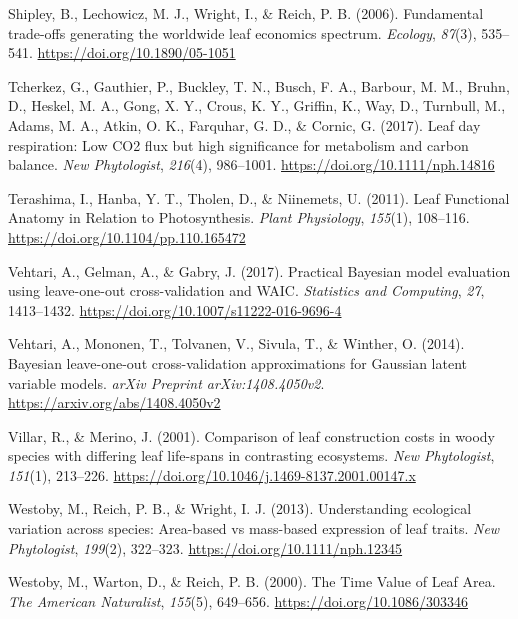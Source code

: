 \documentclass[
  12pt,
  a4paper,
,tablecaptionabove
]{scrartcl}
\newlength{\cslhangindent}
\newenvironment{CSLReferences}[2] %
 {%
  \setlength{\parindent}{0pt}
  \ifodd #1 \everypar{\setlength{\hangindent}{\cslhangindent}}\ignorespaces\fi
  \ifnum #2 > 0
  \setlength{\parskip}{#2\baselineskip}
  \fi
 }%
 {}
\begin{document}
\begin{CSLReferences}{1}{0}
\leavevmode{}%
Shipley, B., Lechowicz, M. J., Wright, I., \& Reich, P. B. (2006).
Fundamental trade-offs generating the worldwide leaf economics spectrum.
\emph{Ecology}, \emph{87}(3), 535--541.
\url{https://doi.org/10.1890/05-1051}

\leavevmode{}%
Tcherkez, G., Gauthier, P., Buckley, T. N., Busch, F. A., Barbour, M.
M., Bruhn, D., Heskel, M. A., Gong, X. Y., Crous, K. Y., Griffin, K.,
Way, D., Turnbull, M., Adams, M. A., Atkin, O. K., Farquhar, G. D., \&
Cornic, G. (2017). Leaf day respiration: Low {CO2} flux but high
significance for metabolism and carbon balance. \emph{New Phytologist},
\emph{216}(4), 986--1001. \url{https://doi.org/10.1111/nph.14816}

\leavevmode{}%
Terashima, I., Hanba, Y. T., Tholen, D., \& Niinemets, U. (2011). Leaf
{Functional Anatomy} in {Relation} to {Photosynthesis}. \emph{Plant
Physiology}, \emph{155}(1), 108--116.
\url{https://doi.org/10.1104/pp.110.165472}

\leavevmode{}%
Vehtari, A., Gelman, A., \& Gabry, J. (2017). Practical {Bayesian} model
evaluation using leave-one-out cross-validation and {WAIC}.
\emph{Statistics and Computing}, \emph{27}, 1413--1432.
\url{https://doi.org/10.1007/s11222-016-9696-4}

\leavevmode{}%
Vehtari, A., Mononen, T., Tolvanen, V., Sivula, T., \& Winther, O.
(2014). Bayesian leave-one-out cross-validation approximations for
{Gaussian} latent variable models. \emph{arXiv Preprint
arXiv:1408.4050v2}. \url{https://arxiv.org/abs/1408.4050v2}

\leavevmode{}%
Villar, R., \& Merino, J. (2001). Comparison of leaf construction costs
in woody species with differing leaf life-spans in contrasting
ecosystems. \emph{New Phytologist}, \emph{151}(1), 213--226.
\url{https://doi.org/10.1046/j.1469-8137.2001.00147.x}

\leavevmode{}%
Westoby, M., Reich, P. B., \& Wright, I. J. (2013). Understanding
ecological variation across species: {Area-based} vs mass-based
expression of leaf traits. \emph{New Phytologist}, \emph{199}(2),
322--323. \url{https://doi.org/10.1111/nph.12345}

\leavevmode{}%
Westoby, M., Warton, D., \& Reich, P. B. (2000). The {Time Value} of
{Leaf Area}. \emph{The American Naturalist}, \emph{155}(5), 649--656.
\url{https://doi.org/10.1086/303346}


\end{CSLReferences}
\end{document}
